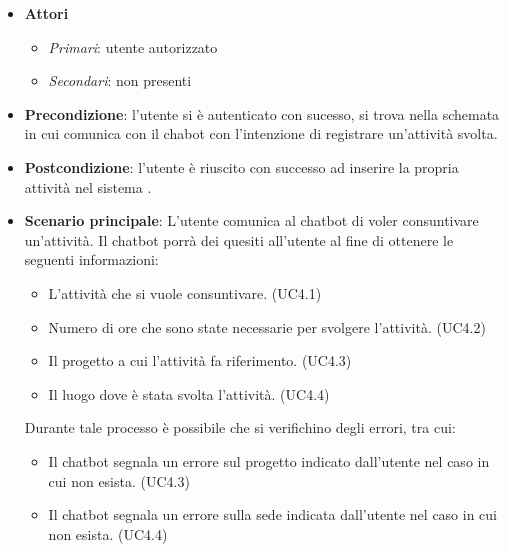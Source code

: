 \begin{itemize}
    \item \textbf{Attori}
    \begin{itemize} 
        \item \textit{Primari}: utente autorizzato
        \item \textit{Secondari}: non presenti
    \end{itemize}
 \item \textbf{Precondizione}: l'utente si è autenticato con sucesso, si trova nella schemata in cui comunica con il chabot con l'intenzione di registrare un'attività svolta. 
 \item \textbf{Postcondizione}: l'utente è riuscito con successo ad inserire la propria attività nel sistema .  
 \item \textbf{Scenario principale}: L'utente comunica al chatbot di voler consuntivare un'attività. Il chatbot porrà dei quesiti all'utente al fine di ottenere le seguenti informazioni: 
    \begin{itemize}
        \item L'attività che si vuole consuntivare. (UC4.1)
        \item Numero di ore che sono state necessarie per svolgere l'attività. (UC4.2)
        \item Il progetto a cui l'attività fa riferimento. (UC4.3)
        \item Il luogo dove è stata svolta l'attività. (UC4.4)
    \end{itemize}
\newpage
 Durante tale processo è possibile che si verifichino degli errori, tra cui: 
    \begin{itemize}
        \item Il chatbot segnala un errore sul progetto indicato dall'utente nel caso in cui non esista. (UC4.3)
        \item Il chatbot segnala un errore sulla sede indicata dall'utente nel caso in cui non esista. (UC4.4)
    \end{itemize}
\end{itemize}

